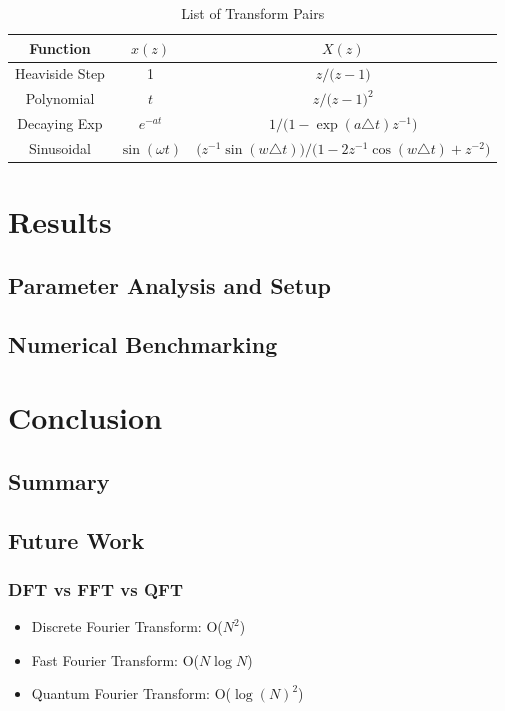 \documentclass[a4paper]{report}
\begin{document}
\begin{table}[h]
    \centering
    \begin{tabular}{c|cc}
    \hline
    \textbf{Function} & $x(z)$ & $X(z)$ \\
    \hline
    Heaviside Step & 1 & $z / \textbf{(}z-1\textbf{)}$ \\
    Polynomial & \(t\) & $z / \textbf{(}z-1\textbf{)}^2 $ \\
    Decaying Exp & $e^{-at}$ & $1 / \textbf{(}1 - \exp(a\triangle t) z^{-1}\textbf{)}$ \\
    Sinusoidal & $\sin(\omega t)$ & $\textbf{(}z^{-1}\sin(w\triangle t)\textbf{)} / \textbf{(}1-2z^{-1}\cos(w\triangle t) + z^{-2}\textbf{)}$
    \end{tabular}
    \caption{List of Transform Pairs}
    \label{tab:transform_pairs}
\end{table}

\chapter{Results}

\section{Parameter Analysis and Setup}

\section{Numerical Benchmarking}

\chapter{Conclusion}
\section{Summary}

\section{Future Work}

\subsection{DFT vs FFT vs QFT}
\begin{itemize}
	\item Discrete Fourier Transform: O($N^2$)
	\item Fast Fourier Transform: O($N\log N$)
	\item Quantum Fourier Transform: O($\log(N)^2$)	
\end{itemize}
\end{document}
